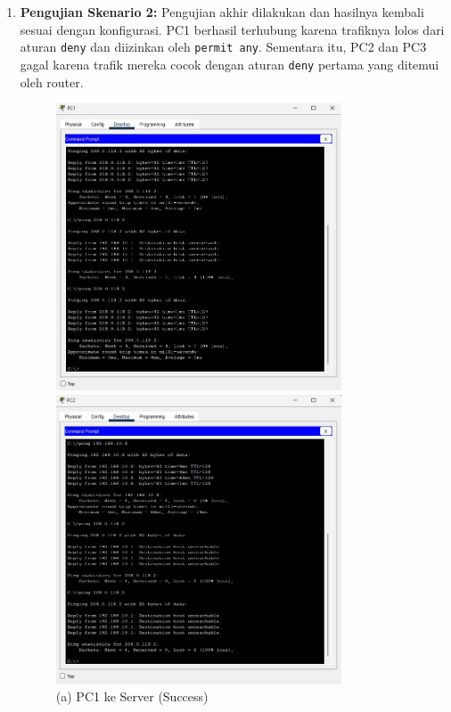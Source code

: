 \begin{enumerate}
    \item \textbf{Pengujian Skenario 2:} Pengujian akhir dilakukan dan hasilnya kembali sesuai dengan konfigurasi. PC1 berhasil terhubung karena trafiknya lolos dari aturan \texttt{deny} dan diizinkan oleh \texttt{permit any}. Sementara itu, PC2 dan PC3 gagal karena trafik mereka cocok dengan aturan \texttt{deny} pertama yang ditemui oleh router.
    \begin{figure}[H]
        \centering
        \begin{minipage}{0.48\textwidth}
            \centering
            \includegraphics[width=0.8\textwidth]{img4/PC1ping2.jpeg}
            \caption*{(a) PC1 ke Server (Success)}
        \end{minipage}\hfill
        \begin{minipage}{0.48\textwidth}
            \centering
            \includegraphics[width=0.8\textwidth]{img4/PC2ping2.jpeg}

\end{minipage}
\end{figure}
\end{enumerate}
